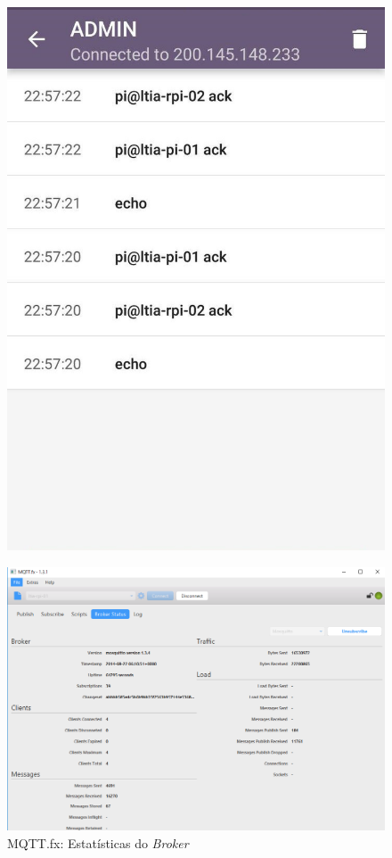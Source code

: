 \begin{figure}[htb]
\begin{minipage}{0.32\textwidth}
		\includegraphics[width=1\textwidth]{052-gateway/mqtt/ad-admin-ack.jpg}
	\end{minipage}
\end{figure}

\begin{figure}[htb]
	\centering
	\caption{\label{fig-mqttfx-stats}MQTT.fx: Estatísticas do \emph{Broker}}
	\includegraphics[width=1\textwidth]{052-gateway/mqtt/mqttfx-stats.png}
\end{figure}

